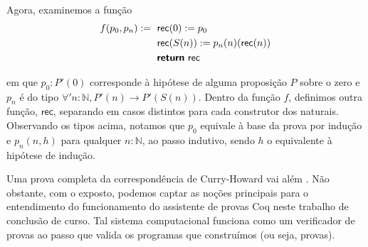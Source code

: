 Agora, examinemos a função \begin{equation*}\begin{split}
f(p_0, p_n) :=\textsf{ }& \textsf{rec}(0) := p_0 \\
& \textsf{rec}(S (n)) := p_n (n) (\textsf{rec}(n)) \\
& \textsf{\textbf{return} }\textsf{rec}
\end{split}\end{equation*}

\noindent
em que $p_0 : P'(0)$ corresponde à hipótese de alguma proposição $P$ sobre o zero e $p_n$ é do tipo $\forall' n:\mathbb{N}, P'(n) \to P'(S(n))$. Dentro da função $f$, definimos outra função, $\textsf{rec}$, separando em casos distintos para cada construtor dos naturais. Observando os tipos acima, notamos que $p_0$ equivale à base da prova por indução e $p_n(n, h)$ para qualquer $n:\mathbb{N}$, ao passo indutivo, sendo $h$ o equivalente à hipótese de indução.

Uma prova completa da correspondência de Curry-Howard vai além \cite{rafael_tcc}. Não obstante, com o exposto, podemos captar as noções principais para o entendimento do funcionamento do assistente de provas Coq neste trabalho de conclusão de curso. Tal sistema computacional funciona como um verificador de provas ao passo que valida os programas que construímos (ou seja, provas).